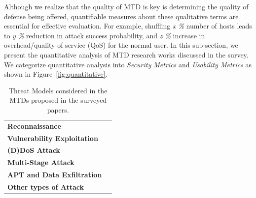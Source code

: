 Although we realize that the quality of MTD is key is determining the quality of defense being offered, quantifiable measures about these qualitative terms are essential for effective evaluation.
For example, shuffling \emph{x \%} number of hosts leads to \emph{y \%} reduction in attack success probability, and \emph{z \%} increase in overhead/quality of service (QoS) for the normal user. In this sub-section, we present the quantitative analysis of MTD research works discussed in the survey. We categorize quantitative analysis into \emph{Security Metrics} and \emph{Usability Metrics} as shown in Figure~\ref{fig:quantitative}.
\begin{figure}[t]
\centering
{} 
\vspace{-0.7em}
\end{figure}
\begin{table}[t]
\centering
\begin{tabular}{p{1.8cm}p{6cm}}
\rowcolor{CornflowerBlue!30!white} \textbf{Reconnaissance} &                    
     
         
                                   \\
\rowcolor{SpringGreen!30!white} \textbf{Vulnerability Exploitation }         &                                 
    
           
                           \\
\rowcolor{Goldenrod!30!white}
\textbf{(D)DoS Attack}         &                          
            \\
\rowcolor{BurntOrange!30!white} \textbf{Multi-Stage Attack}                                    &           
                               \\
\rowcolor{Salmon!30!white} \textbf{APT and Data Exfiltration}                                                  &                                  \\
\rowcolor{NavyBlue!30!white} \textbf{Other types of Attack}                                 &             
      
    \cite {albanese2013moving}                   \\
\end{tabular}
\caption{Threat Models considered in the MTDs proposed in the surveyed papers.}
\label{tab:6}
\end{table}

